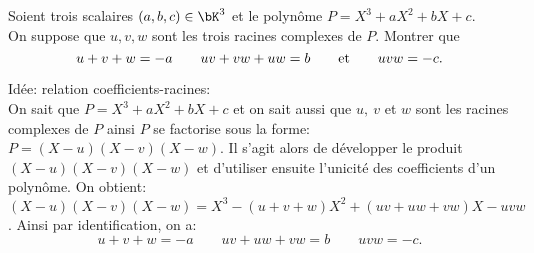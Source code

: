\documentclass[a4paper, 11pt,reqno]{article}
\begin{document}
\begin{exercice}  \;
	Soient trois scalaires $(a,b,c)\in\bK^3$ et le polyn\^ome $P=X^3+aX^2+bX+c$.\\
	\noindent On suppose que $u,v,w$ sont les trois racines complexes de $P$. Montrer que
	$$u+v+w=-a\qquad uv+vw+uw=b\qquad\hbox{et}\qquad uvw=-c.$$
\end{exercice}
\begin{correction}  \; Id\'ee: relation coefficients-racines:\\
	\noindent On sait que $P=X^3+aX^2+bX+c$ et on sait aussi que $u,\ v$ et $w$ sont les racines complexes de $P$ ainsi $P$ se factorise sous la forme: $P=(X-u)(X-v)(X-w)$. Il s'agit alors de d\'evelopper le produit $(X-u)(X-v)(X-w)$ et d'utiliser ensuite l'unicit\'e des coefficients d'un polyn\^{o}me. On obtient:
	$(X-u)(X-v)(X-w)=X^3-(u+v+w)X^2+(uv+uw+vw)X-uvw$. Ainsi par identification, on a:
	$$u+v+w=-a\qquad uv+uw+vw=b\qquad uvw=-c.$$
\end{correction}
\end{document}
